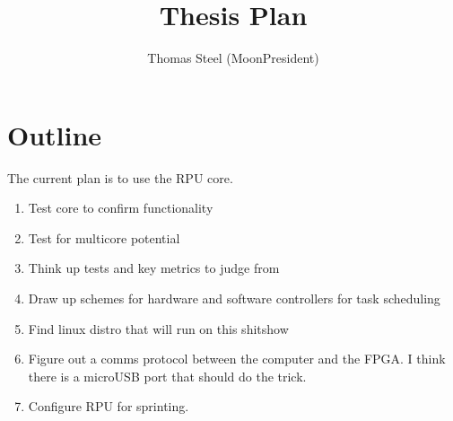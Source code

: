 \documentclass{article}
\title{Thesis Plan}
\author{Thomas Steel (MoonPresident)}
\begin{document}
\maketitle\tableofcontents

\section{Outline}
The current plan is to use the RPU core.
\begin{enumerate}
	\item Test core to confirm functionality
	\item Test for multicore potential
	\item Think up tests and key metrics to judge from
	\item Draw up schemes for hardware and software controllers for task scheduling
	\item Find linux distro that will run on this shitshow
	\item Figure out a comms protocol between the computer and the FPGA. I think there is a microUSB port that should do the trick.
	\item Configure RPU for sprinting.
\end{enumerate}
\end{document}
